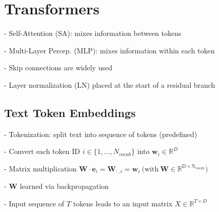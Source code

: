 \section{Transformers}





- Self-Attention (SA): mixes information between tokens

- Multi-Layer Percep. (MLP): mixes information within each token

- Skip connections are widely used

- Layer normalization (LN) placed at the start of a residual branch


\subsection*{Text Token Embeddings}

- Tokenization: split text into sequence of tokens (predefined)

- Convert each token ID $i\in\{1,...,N_{vocab}\}$ into $\mathbf{w}_{i}\in\mathbb{R}^{D}$

- Matrix multiplication $\mathbf{W}\cdot\mathbf{e}_{i}=\mathbf{W}_{:,i}=\mathbf{w}_{i}{\mathrm{~(with~\mathbf{W}\in\mathbb{R}^{D \times N_{vocab}}}})$


- $\mathbf{W}$ learned via backpropagation

- Input sequence of $T$ tokens leads to an input matrix $X\in\mathbb{R}^{T\times D}$


